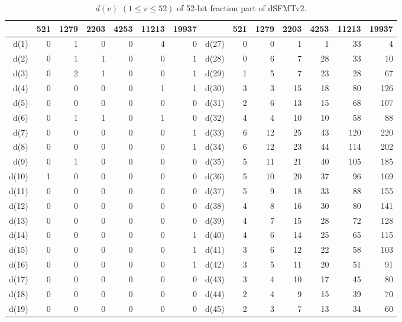 \documentclass{svmult}
\begin{document}
\begin{table}
  \begin{center}
    \caption{$d(v)$ $(1 \leq v \leq 52)$ of 52-bit fraction part of dSFMTv2.}
    \label{tab:dd}
    \begin{tabular}{|r|rrrrrr||r|rrrrrr|} \hline
      & 521 & 1279 & 2203 & 4253 & 11213 & 19937 
      & & 521 & 1279 & 2203 & 4253 & 11213 & 19937 \\ \hline
      d(1) & 0 & 1 & 0 & 0 & 4 & 0 & d(27) & 0 & 0 & 1 & 1 & 33 & 4 \\
      d(2) & 0 & 1 & 1 & 0 & 0 & 1 & d(28) & 0 & 6 & 7 & 28 & 33 & 10 \\
      d(3) & 0 & 2 & 1 & 0 & 0 & 1 & d(29) & 1 & 5 & 7 & 23 & 28 & 67 \\
      d(4) & 0 & 0 & 0 & 0 & 1 & 1 & d(30) & 3 & 3 & 15 & 18 & 80 & 126 \\
      d(5) & 0 & 0 & 0 & 0 & 0 & 0 & d(31) & 2 & 6 & 13 & 15 & 68 & 107 \\
      d(6) & 0 & 1 & 1 & 0 & 1 & 0 & d(32) & 4 & 4 & 10 & 10 & 58 & 88 \\
      d(7) & 0 & 0 & 0 & 0 & 0 & 1 & d(33) & 6 & 12 & 25 & 43 & 120 & 220 \\
      d(8) & 0 & 0 & 0 & 0 & 0 & 1 & d(34) & 6 & 12 & 23 & 44 & 114 & 202 \\
      d(9) & 0 & 1 & 0 & 0 & 0 & 0 & d(35) & 5 & 11 & 21 & 40 & 105 & 185 \\
      d(10) & 1 & 0 & 0 & 0 & 0 & 0 & d(36) & 5 & 10 & 20 & 37 & 96 & 169 \\
      d(11) & 0 & 0 & 0 & 0 & 0 & 0 & d(37) & 5 & 9 & 18 & 33 & 88 & 155 \\
      d(12) & 0 & 0 & 0 & 0 & 0 & 0 & d(38) & 4 & 8 & 16 & 30 & 80 & 141 \\
      d(13) & 0 & 0 & 0 & 0 & 0 & 0 & d(39) & 4 & 7 & 15 & 28 & 72 & 128 \\
      d(14) & 0 & 0 & 0 & 0 & 0 & 1 & d(40) & 4 & 6 & 14 & 25 & 65 & 115 \\
      d(15) & 0 & 0 & 0 & 0 & 0 & 1 & d(41) & 3 & 6 & 12 & 22 & 58 & 103 \\
      d(16) & 0 & 0 & 0 & 0 & 0 & 1 & d(42) & 3 & 5 & 11 & 20 & 51 & 91 \\
      d(17) & 0 & 0 & 0 & 0 & 0 & 0 & d(43) & 3 & 4 & 10 & 17 & 45 & 80 \\
      d(18) & 0 & 0 & 0 & 0 & 0 & 0 & d(44) & 2 & 4 & 9 & 15 & 39 & 70 \\
      d(19) & 0 & 0 & 0 & 0 & 0 & 0 & d(45) & 2 & 3 & 7 & 13 & 34 & 60 \\

\end{tabular}
\end{center}
\end{table}
\end{document}
